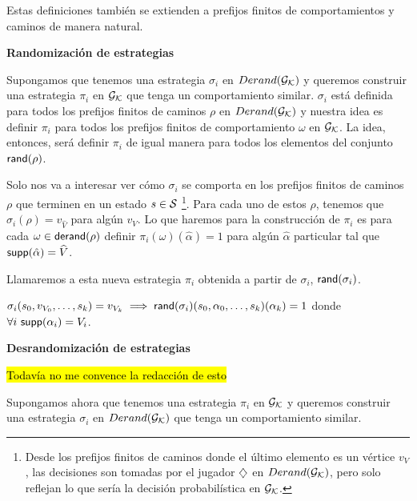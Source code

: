 Estas definiciones también se extienden a prefijos finitos de comportamientos y
caminos de manera natural.

\textbf{Randomización de estrategias}

Supongamos que tenemos una estrategia $\sigma_i$ en $Derand(\mathcal{G}_{\mathcal{K}})$ y queremos construir
una estrategia $\pi_i$ en $\mathcal{G}_{\mathcal{K}}$ que tenga un comportamiento similar. $\sigma_i$
está definida para todos los prefijos finitos de caminos $\rho$ en $Derand(\mathcal{G}_{\mathcal{K}})$ y
nuestra idea es definir $\pi_i$ para todos los prefijos finitos de
comportamiento $\omega$ en $\mathcal{G}_{\mathcal{K}}$. La idea, entonces, será definir $\pi_i$ de
igual manera para todos los elementos del conjunto $\textsf{rand}(\rho)$.

Solo nos va a interesar ver cómo $\sigma_i$ se comporta en los prefijos finitos
de caminos $\rho$ que terminen en un estado $s \in \mathcal{S}$ \footnote{Desde los
	prefijos finitos de caminos donde el último elemento es un vértice $v_V$, las
	decisiones son tomadas por el jugador $\diamondsuit$ en $Derand(\mathcal{G}_{\mathcal{K}})$, pero solo reflejan lo
	que sería la decisión probabilística en $\mathcal{G}_{\mathcal{K}}$.}. Para cada uno de estos $\rho$,
tenemos que $\sigma_i(\rho) = v_{\widehat{V}}$ para algún $v_V$. Lo que haremos
para la construcción de $\pi_i$ es para cada $\omega \in \textsf{derand}(\rho)$ definir
$\pi_i(\omega)(\hat\alpha) = 1$ para algún $\hat\alpha$ particular tal que
$\textsf{supp}(\hat\alpha) = \widehat{V}$.

Llamaremos a esta nueva estrategia $\pi_i$ obtenida a partir de $\sigma_i$,
$\textsf{rand}(\sigma_i)$.

\begin{center}
	$\sigma_i(s_0, v_{V_0}, \dots, s_k) = v_{V_k} \implies \textsf{rand}(\sigma_i)(s_0, \alpha_0, \dots, s_k)(\alpha_k) = 1$ donde \\ $\forall i \ \textsf{supp}(\alpha_i) = V_i$.
\end{center}

\textbf{Desrandomización de estrategias}

\hl{Todavía no me convence la redacción de esto}

Supongamos ahora que tenemos una estrategia $\pi_i$ en $\mathcal{G}_{\mathcal{K}}$ y queremos
construir una estrategia $\sigma_i$ en $Derand(\mathcal{G}_{\mathcal{K}})$ que tenga un comportamiento
similar.

